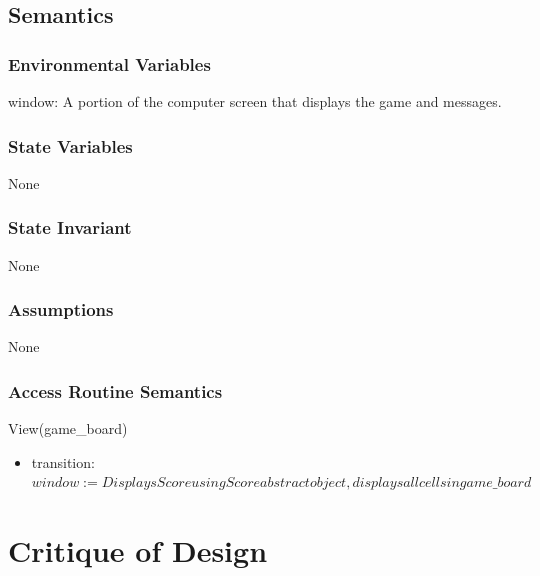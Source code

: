 \documentclass[12pt]{article}
\begin{document}
\subsection* {Semantics}

\subsubsection* {Environmental Variables}

window: A portion of the computer screen that displays the game and messages. 

\subsubsection* {State Variables}

None

\subsubsection* {State Invariant}

None

\subsubsection* {Assumptions}

None

\subsubsection* {Access Routine Semantics}

\noindent View(game\_board)

\begin{itemize}
\item transition: $\mathit{window} := \mathit{Displays Score using Score abstract object, displays all cells in game\_board}$

\end{itemize}

\newpage

\section* {Critique of Design}
\end{document}
